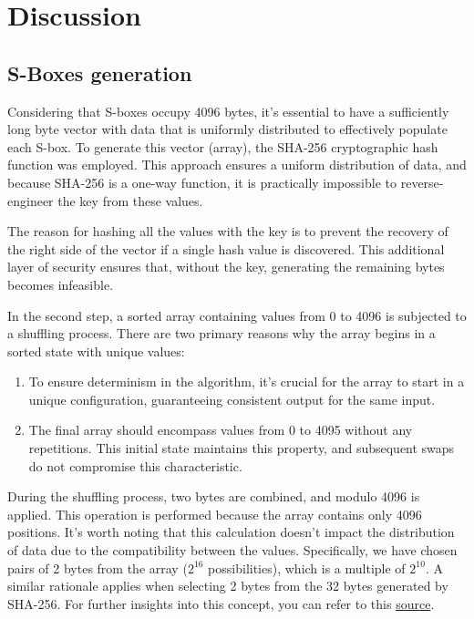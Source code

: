 \documentclass{article} %
\begin{document}
\section {Discussion}

\subsection{S-Boxes generation}
\label{sboxgen}
Considering that S-boxes occupy 4096 bytes, it's essential to have a sufficiently long byte vector with data that is uniformly distributed to effectively populate each S-box. To generate this vector (array), the SHA-256 cryptographic hash function was employed. This approach ensures a uniform distribution of data, and because SHA-256 is a one-way function, it is practically impossible to reverse-engineer the key from these values.

The reason for hashing all the values with the key is to prevent the recovery of the right side of the vector if a single hash value is discovered. This additional layer of security ensures that, without the key, generating the remaining bytes becomes infeasible.

In the second step, a sorted array containing values from 0 to 4096 is subjected to a shuffling process. There are two primary reasons why the array begins in a sorted state with unique values:

\begin{enumerate}
\item To ensure determinism in the algorithm, it's crucial for the array to start in a unique configuration, guaranteeing consistent output for the same input.
\item The final array should encompass values from 0 to 4095 without any repetitions. This initial state maintains this property, and subsequent swaps do not compromise this characteristic.
\end{enumerate}

During the shuffling process, two bytes are combined, and modulo 4096 is applied. This operation is performed because the array contains only 4096 positions. It's worth noting that this calculation doesn't impact the distribution of data due to the compatibility between the values. Specifically, we have chosen pairs of 2 bytes from the array ($2^{16}$ possibilities), which is a multiple of $2^{10}$. A similar rationale applies when selecting 2 bytes from the 32 bytes generated by SHA-256. For further insights into this concept, you can refer to this \href{https://crypto.stackexchange.com/a/21010}{source}.
\end{document}
